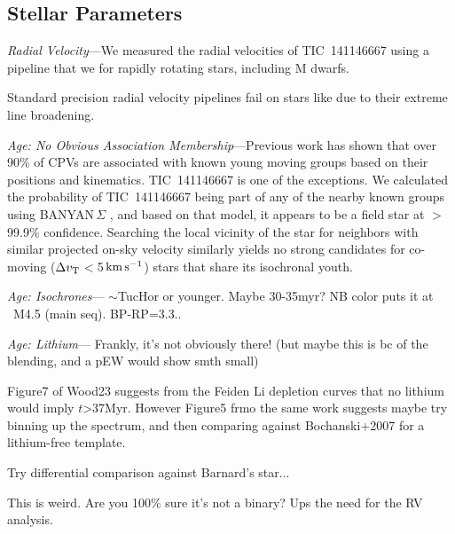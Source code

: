 \documentclass{nature3}
\newcommand{\kms}{\ensuremath{\rm km\,s^{-1}}}
\begin{document}
\begin{methods}


\subsection{Stellar Parameters}

{\it Radial Velocity}---We measured the radial velocities of
TIC~141146667 using a pipeline that we for rapidly rotating
stars, including M dwarfs.


Standard precision radial velocity pipelines
fail on stars like  due to their extreme line broadening.



{\it Age: No Obvious Association Membership}---Previous work
\cite{Bouma2024} has shown that over 90\% of CPVs are associated with
known young moving groups based on their positions and kinematics.
TIC~141146667 is one of the exceptions.  We calculated the probability
of TIC~141146667 being part of any of the nearby known groups using
BANYAN\,$\Sigma$ \cite[v1.2;][]{Gagne2018}, and based on that model,
it appears to be a field star at $>$99.9\% confidence.  Searching the
local vicinity of the star for neighbors with similar projected on-sky
velocity \cite{Tofflemire2021} similarly yields no strong candidates
for co-moving ($\Delta v_{\rm T}$$<$5\,\kms) stars that share its
isochronal youth.

{\it Age: Isochrones}--- $\sim$TucHor or younger.  Maybe 30-35myr?  NB
  color puts it at ~M4.5 (main seq).  BP-RP=3.3..

{\it Age: Lithium}--- Frankly, it's not obviously there!  (but maybe
this is bc of the blending, and a pEW would show smth small)

Figure7 of Wood23 suggests from the Feiden Li depletion curves that no lithium would imply $t$>37Myr.
However Figure5 frmo the same work suggests maybe try binning up the spectrum, and then comparing against Bochanski+2007 for a lithium-free template.

Try differential comparison against Barnard's star...

This is weird.  Are you 100\% sure it's not a binary?  Ups the need for
the RV analysis.




\end{methods}
\end{document}
